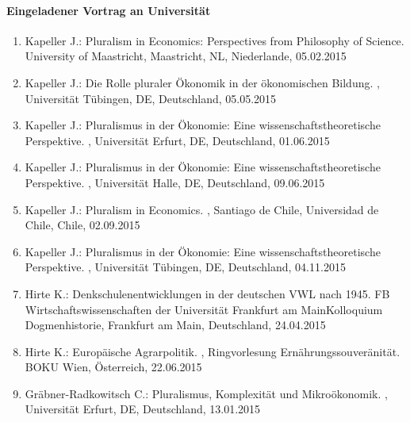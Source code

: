 \paragraph{Eingeladener Vortrag an Universität}
\begin{enumerate}
	\item Kapeller J.: Pluralism in Economics: Perspectives from Philosophy of Science. University of Maastricht, Maastricht, NL, Niederlande, 05.02.2015
	\item Kapeller J.: Die Rolle pluraler Ökonomik in der ökonomischen Bildung. , Universität Tübingen, DE, Deutschland, 05.05.2015
	\item Kapeller J.: Pluralismus in der Ökonomie: Eine wissenschaftstheoretische Perspektive. , Universität Erfurt, DE, Deutschland, 01.06.2015
	\item Kapeller J.: Pluralismus in der Ökonomie: Eine wissenschaftstheoretische Perspektive. , Universität Halle, DE, Deutschland, 09.06.2015
	\item Kapeller J.: Pluralism in Economics. , Santiago de Chile, Universidad de Chile, Chile, 02.09.2015
	\item Kapeller J.: Pluralismus in der Ökonomie: Eine wissenschaftstheoretische Perspektive. , Universität Tübingen, DE, Deutschland, 04.11.2015
	\item Hirte K.: Denkschulenentwicklungen in der deutschen VWL nach 1945. FB Wirtschaftswissenschaften der Universität Frankfurt am MainKolloquium Dogmenhistorie, Frankfurt am Main, Deutschland, 24.04.2015
	\item Hirte K.: Europäische Agrarpolitik. , Ringvorlesung Ernährungssouveränität. BOKU Wien, Österreich, 22.06.2015
	\item Gräbner-Radkowitsch C.: Pluralismus, Komplexität und Mikroökonomik. , Universität Erfurt, DE, Deutschland, 13.01.2015
\end{enumerate}
